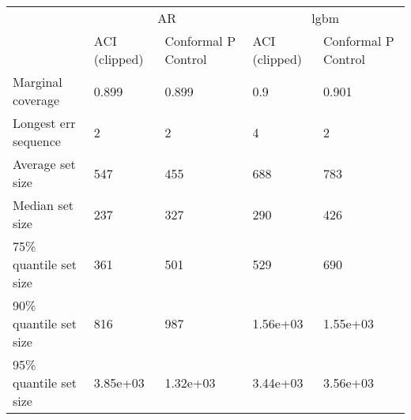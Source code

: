 \begin{tabular}{lllll}
\toprule
& \multicolumn{2}{c}{AR}& \multicolumn{2}{c}{lgbm} \\
& ACI (clipped) & Conformal P Control & ACI (clipped) & Conformal P Control \\
\midrule
Marginal coverage & 0.899 & 0.899 & 0.9 & 0.901 \\
Longest err sequence & 2 & 2 & 4 & 2 \\
Average set size & 547 & 455 & 688 & 783 \\
Median set size & 237 & 327 & 290 & 426 \\
75\% quantile set size & 361 & 501 & 529 & 690 \\
90\% quantile set size & 816 & 987 & 1.56e+03 & 1.55e+03 \\
95\% quantile set size & 3.85e+03 & 1.32e+03 & 3.44e+03 & 3.56e+03 \\
\bottomrule
\end{tabular}
